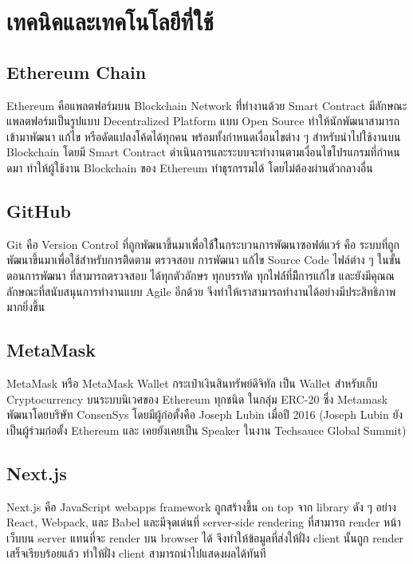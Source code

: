 \documentclass[12pt,oneside,openright,a4paper]{cpe-thai-project}
\begin{document}
\section{เทคนิคและเทคโนโลยีที่ใช้}

\subsection{Ethereum Chain  \cite{eth}} 
\tab Ethereum คือแพลตฟอร์มบน Blockchain Network ที่่ทํางานด้วย Smart Contract มีลักษณะแพลตฟอร์มเป็นรูปแบบ Decentralized Platform แบบ Open Source ทําให้นักพัฒนาสามารถเข้ามาพัฒนา แก้ไข หรือดัดแปลงโค้ดได้ทุกคน พร้อมทั้งกําหนดเงื่อนไขต่าง ๆ สําหรับนําไปใช้งานบน Blockchain โดยมี Smart Contract ดําเนินการและระบบจะทํางานตามเงื่อนไขโปรแกรมที่กําหนดมา ทําให้ผู้ใช้งาน Blockchain ของ Ethereum ทําธุรกรรมได้ โดยไม่ต้องผ่านตัวกลางอื่น

\subsection{GitHub  \cite{github}}
\tab Git คือ Version Control ที่ถูกพัฒนาขึ้นมาเพื่อใช้ใ้นกระบวนการพัฒนาซอฟต์แวร์ คือ ระบบที่ถูกพัฒนาขึ้นมาเพื่อใช้สำหรับการติิดตาม ตรวจสอบ การพัฒนา แก้ไข Source Code ไฟล์ต่าง ๆ ในขั้นตอนการพัฒนา ที่สามารถตรวจสอบ ได้ทุกตัวอักษร ทุกบรรทัด ทุกไฟล์์ที่มีีการแก้ไข และยังมีคุณณลักษณะที่สนับสนุนการทำงานแบบ Agile อีกด้วย จึงทำให้เราสามารถทำงานได้อย่างมีประสิทธิภาพมากยิ่งขึ้น

\subsection{MetaMask \cite{metamask}}
\tab MetaMask หรือ MetaMask Wallet กระเป๋าเงินสินทรัพย์ดิจิทัล เป็น Wallet สำหรับเก็บ Cryptocurrency บนระบบนิเวศของ Ethereum ทุกชนิด ในกลุ่ม ERC-20 ซึ่ง Metamask พัฒนาโดยบริษัท ConsenSys โดยมีผู้ก่อตั้งคือ Joseph Lubin เมื่อปี 2016 (Joseph Lubin ยังเป็นผู้ร่วมก่อตั้ง Ethereum และ เคยยังเคยเป็น Speaker ในงาน Techsauce Global Summit)

\subsection{Next.js \cite{nextjs}}
\tab Next.js คือ JavaScript webapps framework ถูกสร้างขึ้น on top จาก library ดัง ๆ อย่าง React, Webpack, และ Babel และมีจุดเด่นที่ server-side rendering ที่สามารถ render หน้าเว็บบน server แทนที่จะ render บน browser ได้ จึงทำให้ข้อมูลที่ส่งให้ฝั่ง client นั้นถูก render เสร็จเรียบร้อยแล้ว ทำให้ฝั่ง client สามารถนำไปแสดงผลได้ทันที
\end{document}
